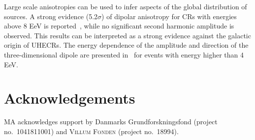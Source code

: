 \documentclass{PoS}
\begin{document}
Large scale anisotropies can be used to infer aspects of the global distribution of sources. A strong evidence (5.2$\sigma$) of dipolar anisotropy for CRs with energies above 8 EeV is reported~\cite{Aab:2017tyv}, while no significant second harmonic amplitude is observed. This results can be interpreted as a strong evidence against the galactic origin of UHECRs. The energy dependence of the amplitude and direction of the three-dimensional dipole are presented in~\cite{Aab:2018mmi} for events with energy higher than 4 EeV. 



\section*{Acknowledgements}
MA acknowledges support by Danmarks Grundforskningsfond (project no.~1041811001) and \textsc{Villum Fonden} (project no.~18994).



\end{document}
